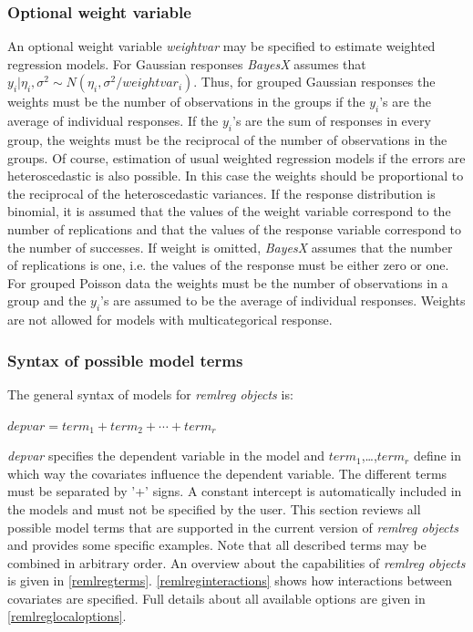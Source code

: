 \subsubsection{Optional weight variable }
\label{remlregweightspecification}

An optional weight variable {\em weightvar} may be specified to
estimate weighted regression models. For Gaussian responses {\em
BayesX} assumes that $y_i|\eta_i,\sigma^2 \sim
N(\eta_i,\sigma^2/weightvar_i)$. Thus, for grouped Gaussian
responses the weights must be the number of observations in the
groups if the $y_i$'s are the average of individual responses. If
the $y_i$'s are the sum of responses in every group, the weights
must be the reciprocal of the number of observations in the
groups. Of course, estimation of usual weighted regression models
if the errors are heteroscedastic is also possible. In this case
the weights should be proportional to the reciprocal of the
heteroscedastic variances. If the response distribution is
binomial, it is assumed that the values of the weight variable
correspond to the number of replications and that the values of
the response variable correspond to the number of successes. If
weight is omitted, {\em BayesX} assumes that the number of
replications is one, i.e. the values of the response must be
either zero or one. For grouped Poisson data the weights must be
the number of observations in a group and the $y_i$'s are assumed
to be the average of individual responses. Weights are not allowed
for models with multicategorical response.

\subsubsection{Syntax of possible model terms}
\label{remlregmodelsyntax}

The general syntax of models for {\em remlreg objects} is:

$depvar = term_1 + term_2 + \cdots + term_r$

{\em depvar} specifies the dependent variable in the model and
$term_1$,\dots,$term_r$ define in which way the covariates
influence the dependent variable. The different terms must be
separated by '+' signs. A constant intercept is automatically
included in the models and must not be specified by the user. This
section reviews all possible model terms that are supported in the
current version of {\em remlreg objects} and provides some
specific examples. Note that all described terms may be combined
in arbitrary order. An overview about the capabilities of {\em
remlreg objects} is given in \autoref{remlregterms}.
\autoref{remlreginteractions} shows how interactions between
covariates are specified. Full details about all available options
are given in \autoref{remlreglocaloptions}.

